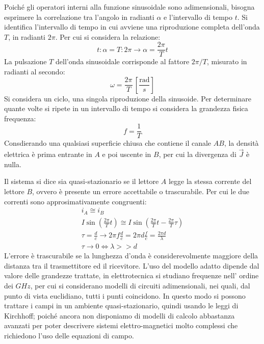 \documentclass{article}
\numberwithin{equation}{subsection}
\begin{document}
Poiché gli operatori interni alla funzione sinusoidale sono adimensionali, bisogna esprimere la correlazione tra l'angolo in radianti $\alpha$ e l'intervallo di tempo $t$. 
Si identifica l'intervallo di tempo in cui avviene una riproduzione completa dell'onda $T$, in radianti $2\pi$. Per cui si considera la relazione:
\begin{equation*}
    t:\alpha=T:2\pi\to\displaystyle\alpha=\frac{2\pi}{T}t
\end{equation*}
La pulsazione $T$ dell'onda sinusoidale corrisponde al fattore ${2\pi}/T$, misurato in radianti al secondo:
\begin{equation*}
    \omega=\displaystyle\frac{2\pi}{T}\,\left[\frac{\mbox{rad}}{s}\right]
\end{equation*}
Si considera un ciclo, una singola riproduzione della sinusoide. Per determinare quante volte si ripete in un intervallo di tempo si considera la grandezza fisica frequenza:
\begin{equation*}
    f=\displaystyle\frac{1}{T}
\end{equation*}
Consdierando una qualsiasi superficie chiusa che contiene il canale $AB$, la densità elettrica è prima entrante in $A$ e poi uscente in $B$, per cui la divergenza di $\vec J$ 
è nulla.


Il sistema si dice sia quasi-stazionario se il lettore $A$ legge la stessa corrente del lettore $B$, ovvero è presente un errore accettabile o trascurabile. 
Per cui le due correnti sono approsimativamente congruenti:
\begin{gather*}
    i_A\cong i_B\\
    I\sin\displaystyle\left(\frac{2\pi}{T}t\right)\cong I\sin\left(\frac{2\pi}{T}t-\frac{2\pi}{T}\tau\right)\\
    \tau=\displaystyle\frac{d}{c}\to \displaystyle 2\pi f\frac{d}{c}=2\pi d\frac{f}{c}=\frac{2\pi d}{\lambda}\\
    \tau\to 0\iff \lambda>>d
\end{gather*}
L'errore è trascurabile se la lunghezza d'onda è considerevolmente maggiore della distanza tra il trasmettitore ed il ricevitore. 
L'uso del modello adatto dipende dal valore delle grandezze trattate, in elettrotecnica si studiano frequenze nell'
ordine dei $GHz$, per cui si considerano modelli di circuiti adimensionali, nei quali, dal punto di vista euclidiano, tutti i punti coincidono. In questo modo si possono 
trattare i campi in un ambiente quasi-stazionario, quindi usando le leggi di Kirchhoff; poiché ancora non disponiamo di modelli di calcolo abbastanza avanzati per poter 
descrivere sistemi elettro-magnetici molto complessi che richiedono l'uso delle equazioni di campo. 
\end{document}

